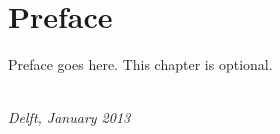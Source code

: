 \chapter*{Preface}

Preface goes here. This chapter is optional.

\begin{flushright}
{\makeatletter\itshape
    \@firstname\ \@lastname \\
    Delft, January 2013
\makeatother}
\end{flushright}

